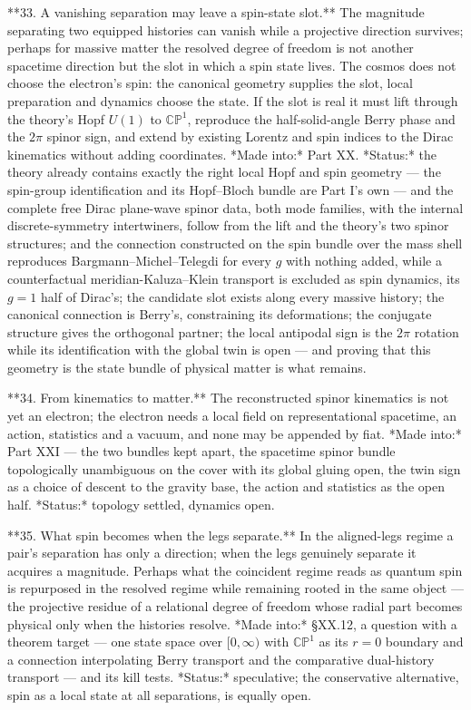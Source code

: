 **33. A vanishing separation may leave a spin-state slot.** The magnitude separating two equipped histories can vanish while a projective direction survives; perhaps for massive matter the resolved degree of freedom is not another spacetime direction but the slot in which a spin state lives. The cosmos does not choose the electron's spin: the canonical geometry supplies the slot, local preparation and dynamics choose the state. If the slot is real it must lift through the theory's Hopf $U(1)$ to $\mathbb{CP}^1$, reproduce the half-solid-angle Berry phase and the $2\pi$ spinor sign, and extend by existing Lorentz and spin indices to the Dirac kinematics without adding coordinates. *Made into:* Part XX. *Status:* the theory already contains exactly the right local Hopf and spin geometry — the spin-group identification and its Hopf–Bloch bundle are Part I's own — and the complete free Dirac plane-wave spinor data, both mode families, with the internal discrete-symmetry intertwiners, follow from the lift and the theory's two spinor structures; and the connection constructed on the spin bundle over the mass shell reproduces Bargmann–Michel–Telegdi for every $g$ with nothing added, while a counterfactual meridian-Kaluza–Klein transport is excluded as spin dynamics, its $g = 1$ half of Dirac's; the candidate slot exists along every massive history; the canonical connection is Berry's, constraining its deformations; the conjugate structure gives the orthogonal partner; the local antipodal sign is the $2\pi$ rotation while its identification with the global twin is open — and proving that this geometry is the state bundle of physical matter is what remains.

**34. From kinematics to matter.** The reconstructed spinor kinematics is not yet an electron; the electron needs a local field on representational spacetime, an action, statistics and a vacuum, and none may be appended by fiat. *Made into:* Part XXI — the two bundles kept apart, the spacetime spinor bundle topologically unambiguous on the cover with its global gluing open, the twin sign as a choice of descent to the gravity base, the action and statistics as the open half. *Status:* topology settled, dynamics open.

**35. What spin becomes when the legs separate.** In the aligned-legs regime a pair's separation has only a direction; when the legs genuinely separate it acquires a magnitude. Perhaps what the coincident regime reads as quantum spin is repurposed in the resolved regime while remaining rooted in the same object — the projective residue of a relational degree of freedom whose radial part becomes physical only when the histories resolve. *Made into:* §XX.12, a question with a theorem target — one state space over $[0,\infty)$ with $\mathbb{CP}^1$ as its $r = 0$ boundary and a connection interpolating Berry transport and the comparative dual-history transport — and its kill tests. *Status:* speculative; the conservative alternative, spin as a local state at all separations, is equally open.

